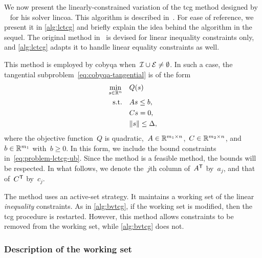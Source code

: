 We now present the linearly-constrained variation of the \gls{tcg} method designed by \citeauthor{Powell_2015}~\cite{Powell_2015} for his solver \gls{lincoa}.
This algorithm is described in~\cite[\S~3,\S~5]{Powell_2015}.
For ease of reference, we present it in \cref{alg:lctcg} and briefly explain the idea behind the algorithm in the sequel.
The original method in~\cite{Powell_2015} is devised for linear inequality constraints only, and \cref{alg:lctcg} adapts it to handle linear equality constraints as well.

This method is employed by \gls{cobyqa} when~$\mathcal{I} \cup \mathcal{E} \neq \emptyset$.
In such a case, the tangential subproblem~\cref{eq:cobyqa-tangential} is of the form
\begin{subequations}
    \label{eq:problem-lctcg}
    \begin{align}
        \min_{\sstep \in \R^n}  & \quad Q(\sstep)\\
        \text{s.t.}             & \quad A \sstep \le b, \label{eq:problem-lctcg-ub}\\
                                & \quad C \sstep = 0,\\
                                & \quad \norm{\sstep} \le \rad,
    \end{align}
\end{subequations}
where the objective function~$Q$ is quadratic,~$A \in \mathbb{R}^{m_1 \times n}$,~$C \in \mathbb{R}^{m_2 \times n}$, and~$b \in \mathbb{R}^{m_1}$ with~$b \ge 0$.
In this form, we include the bound constraints in~\cref{eq:problem-lctcg-ub}.
Since the method is a feasible method, the bounds will be respected.
In what follows, we denote the~$j$th column of~$A^{\mathsf{T}}$ by~$a_j$, and that of~$C^{\mathsf{T}}$ by~$c_j$.

The method uses an active-set strategy.
It maintains a working set of the linear \emph{inequality} constraints.
As in \cref{alg:bvtcg}, if the working set is modified, then the \gls{tcg} procedure is restarted.
However, this method allows constraints to be removed from the working set, while \cref{alg:bvtcg} does not.

\subsubsection{Description of the working set}

